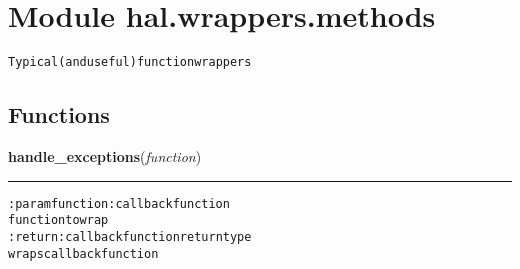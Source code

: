 %
%
%


\section{Module hal.wrappers.methods}

    \label{hal:wrappers:methods}
\begin{alltt}
Typical (and useful) function wrappers 
\end{alltt}



  \subsection{Functions}

    \label{hal:wrappers:methods:handle_exceptions}

    \vspace{0.5ex}

\hspace{.8\funcindent}\begin{boxedminipage}{\funcwidth}

    \raggedright \textbf{handle\_exceptions}(\textit{function})

    \vspace{-1.5ex}

    \rule{\textwidth}{0.5\fboxrule}
\setlength{\parskip}{2ex}
\begin{alltt}

:param function: callback function
    function to wrap
:return: callback function return type
    wraps callback function
\end{alltt}

\setlength{\parskip}{1ex}
    \end{boxedminipage}

